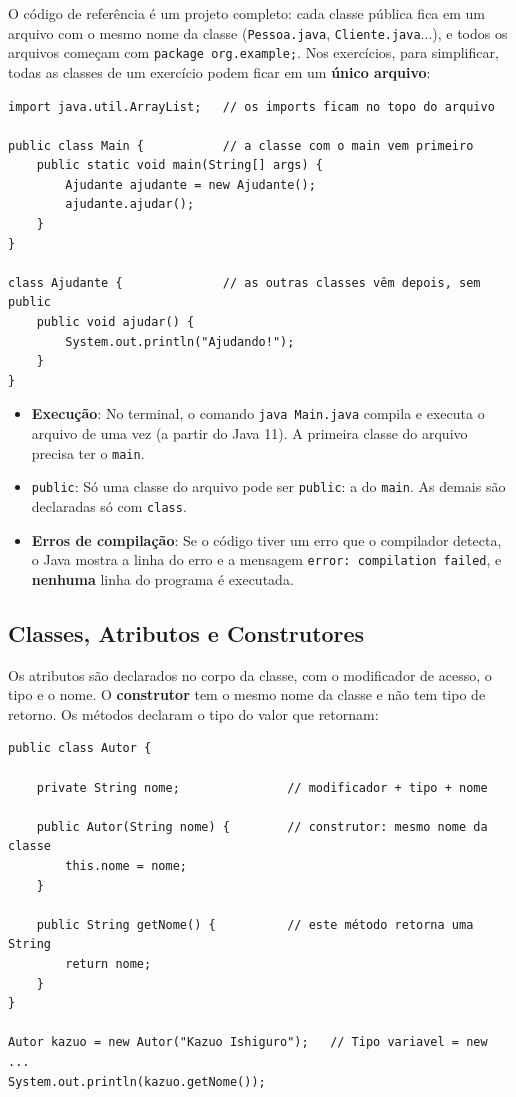 O código de referência é um projeto completo: cada classe pública fica em um arquivo com o
mesmo nome da classe (\texttt{Pessoa.java}, \texttt{Cliente.java}...), e todos os arquivos
começam com \texttt{package org.example;}. Nos exercícios, para simplificar, todas as classes
de um exercício podem ficar em um \textbf{único arquivo}:

\begin{lstlisting}[style=java]
import java.util.ArrayList;   // os imports ficam no topo do arquivo

public class Main {           // a classe com o main vem primeiro
    public static void main(String[] args) {
        Ajudante ajudante = new Ajudante();
        ajudante.ajudar();
    }
}

class Ajudante {              // as outras classes vêm depois, sem public
    public void ajudar() {
        System.out.println("Ajudando!");
    }
}
\end{lstlisting}

\begin{itemize}
    \item \textbf{Execução}: No terminal, o comando \texttt{java Main.java} compila e executa o
    arquivo de uma vez (a partir do Java 11). A primeira classe do arquivo precisa ter o
    \texttt{main}.

    \item \texttt{public}: Só uma classe do arquivo pode ser \texttt{public}: a do
    \texttt{main}. As demais são declaradas só com \texttt{class}.

    \item \textbf{Erros de compilação}: Se o código tiver um erro que o compilador detecta, o
    Java mostra a linha do erro e a mensagem \texttt{error: compilation failed}, e
    \textbf{nenhuma} linha do programa é executada.
\end{itemize}

\subsection{Classes, Atributos e Construtores}

Os atributos são declarados no corpo da classe, com o modificador de acesso, o tipo e o nome. O
\textbf{construtor} tem o mesmo nome da classe e não tem tipo de retorno. Os métodos declaram o
tipo do valor que retornam:

\begin{lstlisting}[style=java]
public class Autor {

    private String nome;               // modificador + tipo + nome

    public Autor(String nome) {        // construtor: mesmo nome da classe
        this.nome = nome;
    }

    public String getNome() {          // este método retorna uma String
        return nome;
    }
}

Autor kazuo = new Autor("Kazuo Ishiguro");   // Tipo variavel = new ...
System.out.println(kazuo.getNome());
\end{lstlisting}

